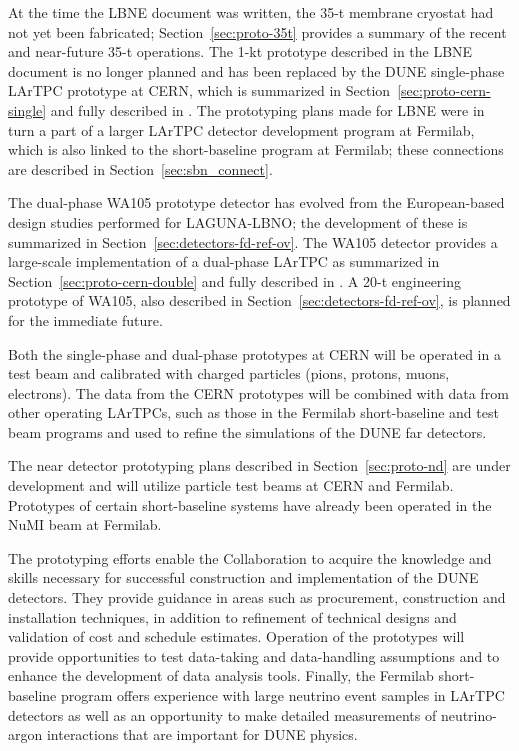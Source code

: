 At the time the LBNE document was written, the 35-t membrane cryostat
had not yet been fabricated; Section~\ref{sec:proto-35t} provides a
summary of the recent and near-future 35-t operations.  The 1-kt
prototype described in the LBNE document is no longer planned and has
been replaced by the DUNE single-phase LArTPC prototype at CERN, which
is summarized in Section~\ref{sec:proto-cern-single} and fully
described in \anxcernproto.  The prototyping plans made for LBNE were
in turn a part of a larger LArTPC detector development program at
Fermilab, which is also linked to the short-baseline program at
Fermilab; these connections are described in
Section~\ref{sec:sbn_connect}.

The dual-phase WA105 prototype detector has evolved from the
European-based design studies performed for LAGUNA-LBNO; the
development of these is summarized in
Section~\ref{sec:detectors-fd-ref-ov}.  The WA105 detector provides a
large-scale implementation of a dual-phase LArTPC as summarized 
in Section~\ref{sec:proto-cern-double} and fully described in
\anxdualtdr.  A 20-t engineering prototype of WA105, also described in
Section~\ref{sec:detectors-fd-ref-ov}, is planned for the immediate
future.

Both the single-phase and dual-phase prototypes at CERN will be
operated in a test beam and calibrated with charged particles (pions,
protons, muons, electrons). The data from the CERN prototypes will be
combined with data from other operating LArTPCs, such as those in the
Fermilab short-baseline and test beam programs and used to refine the
simulations of the DUNE far detectors.

The near detector prototyping plans described in
Section~\ref{sec:proto-nd} are under development and will
utilize particle test beams at CERN and Fermilab.  Prototypes
of certain short-baseline systems have already been operated in the
NuMI beam at Fermilab.

The prototyping efforts enable the Collaboration
to acquire the knowledge and skills necessary for successful
construction and implementation of the DUNE detectors. They provide
guidance in areas such as procurement, construction and installation
techniques, in addition to refinement of technical designs and validation of
cost and schedule estimates.  Operation of the prototypes will provide
opportunities to test data-taking and data-handling assumptions and
to enhance the development of data analysis tools.  Finally, the
Fermilab short-baseline program offers experience with large neutrino
event samples in LArTPC detectors as well as an opportunity to make
detailed measurements of neutrino-argon interactions that are
important for DUNE physics. 

